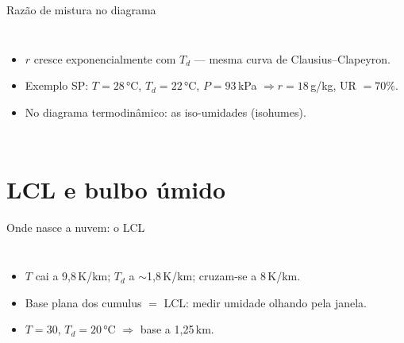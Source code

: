 \documentclass[aspectratio=169,11pt]{beamer}
\begin{document}
\begin{frame}{Razão de mistura no diagrama}
  \begin{columns}
    \vspace{0.4em}
    \begin{itemize}
      \item $r$ cresce exponencialmente com $T_d$ — mesma curva de
            Clausius--Clapeyron.
      \item Exemplo SP: $T=28\,°$C, $T_d=22\,°$C, $P=93$\,kPa
            $\Rightarrow r = 18$\,g/kg, UR $= 70\%$.
      \item No diagrama termodinâmico: as \alert{iso-umidades}
            (isohumes).
    \end{itemize}
  \end{columns}
\end{frame}

\section{LCL e bulbo úmido}

\begin{frame}{Onde nasce a nuvem: o LCL}
  \begin{columns}
    \vspace{0.4em}
    \begin{itemize}
      \item $T$ cai a 9{,}8\,K/km; $T_d$ a $\sim$1{,}8\,K/km; cruzam-se
            a 8\,K/km.
      \item Base plana dos cumulus $=$ LCL: \alert{medir umidade
            olhando pela janela}.
      \item $T=30$, $T_d=20\,°$C $\Rightarrow$ base a 1{,}25\,km.
    \end{itemize}
  \end{columns}
\end{frame}
\end{document}
